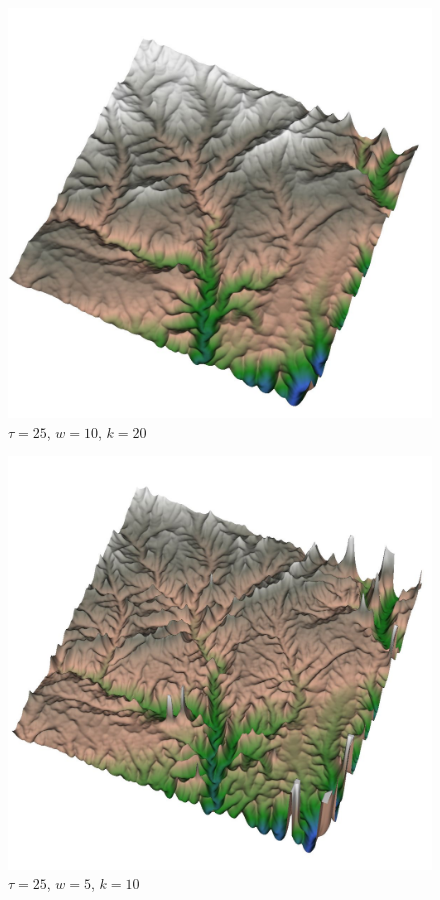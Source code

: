 \begin{figure}[t]
\begin{center}
  \begin{minipage}{0.49\linewidth} \includegraphics[width=0.99\linewidth]{images/W10_I20_T25.jpg} \\ \centering $\tau=25$, $w=10$, $k=20$ \end{minipage}
  \begin{minipage}{0.49\linewidth} \includegraphics[width=0.99\linewidth]{images/W5_I10_T25.jpg} \\ \centering $\tau=25$, $w=5$, $k=10$ \end{minipage}

\end{center}
\end{figure}
